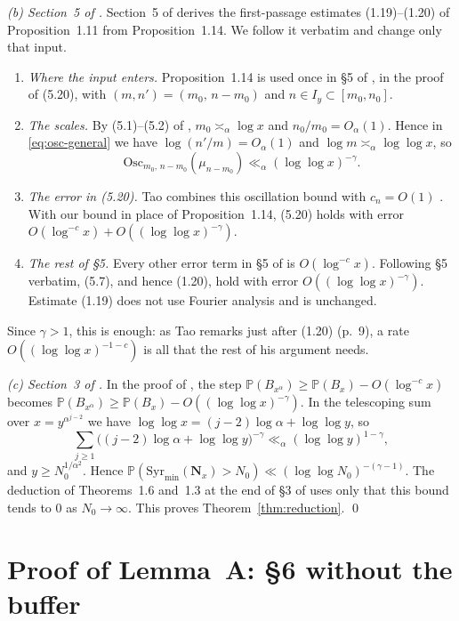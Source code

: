 \documentclass[11pt]{amsart}
\theoremstyle{remark}
\renewcommand{\P}{\mathbb{P}}
\newcommand{\Osc}{\mathrm{Osc}}
\newcommand{\T}[1]{\cite[#1]{Tao22}}   %
\newcommand{\Tc}{\cite{Tao22}}         %
\theoremstyle{plain}
\begin{document}
\emph{(b) Section~5 of \Tc.} Section~5 of \Tc{} derives the first-passage estimates (1.19)--(1.20) of Proposition~1.11 from Proposition~1.14. We follow it verbatim and change only that input.
\begin{enumerate}
\item \emph{Where the input enters.} Proposition~1.14 is used once in \S5 of \Tc, in the proof of (5.20), with $(m,n')=(m_0,\,n-m_0)$ and $n\in I_y\subset[m_0,n_0]$.
\item \emph{The scales.} By (5.1)--(5.2) of \Tc, $m_0\asymp_\alpha\log x$ and $n_0/m_0=O_\alpha(1)$. Hence in \eqref{eq:osc-general} we have $\log(n'/m)=O_\alpha(1)$ and $\log m\asymp_\alpha\log\log x$, so
\[
\Osc_{m_0,\,n-m_0}(\mu_{n-m_0})\ll_\alpha(\log\log x)^{-\gamma}.
\]
\item \emph{The error in (5.20).} Tao combines this oscillation bound with $c_n=O(1)$ \T{Lemma 5.3}. With our bound in place of Proposition~1.14, (5.20) holds with error $O(\log^{-c}x)+O((\log\log x)^{-\gamma})$.
\item \emph{The rest of \S5.} Every other error term in \S5 of \Tc{} is $O(\log^{-c}x)$. Following \S5 verbatim, (5.7), and hence (1.20), hold with error $O((\log\log x)^{-\gamma})$. Estimate (1.19) does not use Fourier analysis and is unchanged.
\end{enumerate}
Since $\gamma>1$, this is enough: as Tao remarks just after (1.20) (p.~9), a rate $O((\log\log x)^{-1-c})$ is all that the rest of his argument needs.

\emph{(c) Section~3 of \Tc.} In the proof of \T{Theorem 3.1}, the step $\P(B_{x^\alpha})\ge\P(B_x)-O(\log^{-c}x)$ becomes $\P(B_{x^\alpha})\ge\P(B_x)-O((\log\log x)^{-\gamma})$. In the telescoping sum over $x=y^{\alpha^{j-2}}$ we have $\log\log x=(j-2)\log\alpha+\log\log y$, so
\[
\sum_{j\ge1}\big((j-2)\log\alpha+\log\log y\big)^{-\gamma}\ll_\alpha(\log\log y)^{1-\gamma},
\]
and $y\ge N_0^{1/\alpha^2}$. Hence $\P(\mathrm{Syr}_{\min}(\mathbf N_x)>N_0)\ll(\log\log N_0)^{-(\gamma-1)}$. The deduction of Theorems~1.6 and~1.3 at the end of \S3 of \Tc{} uses only that this bound tends to $0$ as $N_0\to\infty$. This proves Theorem~\ref{thm:reduction}. \qed
\section{Proof of Lemma~A: \S6 without the buffer}\label{sec:A}
\end{document}
